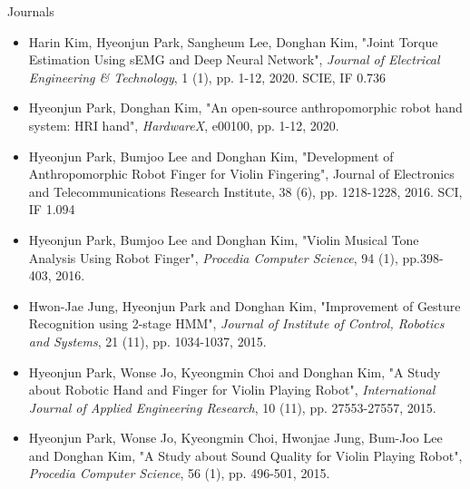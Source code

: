 \documentclass[a4paper,10pt]{article}
\newlength{\cvcolumngapwidth}
\newlength{\cvleftcolumnwidth}
\newlength{\cvrightcolumnwidth}
\newcommand{\cvheadingstyle}[1]{{\normalsize\cvheadingfont\textcolor{cvheadingcolor}{#1}}}
\newlength{\cvafteritemskipamount}
\newlength{\cvparskip}
\newcommand{\cvitem}[2]{
    \begin{minipage}[t]{\cvleftcolumnwidth}
        \raggedleft #1
    \end{minipage}%
    \hspace{\cvcolumngapwidth}%
    \begin{minipage}[t]{\cvrightcolumnwidth}
        \setlength{\parskip}{\cvparskip} #2
    \end{minipage}

    \vspace{\cvafteritemskipamount}
}
\begin{document}
\cvitem{
    \cvheadingstyle{Journals}
}{
    \begin{itemize}
    \item Harin Kim, {\cvimportant Hyeonjun Park}, Sangheum Lee, Donghan Kim, "Joint Torque Estimation Using sEMG and Deep Neural Network", {\em Journal of Electrical Engineering & Technology}, 1 (1), pp. 1-12, 2020.  {\cvimportant SCIE, IF 0.736}
    \item {\cvimportant Hyeonjun Park}, Donghan Kim, "An open-source anthropomorphic robot hand system: HRI hand", {\em HardwareX}, e00100, pp. 1-12, 2020.  
    \item {\cvimportant Hyeonjun Park}, Bumjoo Lee and Donghan Kim, "Development of Anthropomorphic Robot Finger for Violin Fingering", Journal of Electronics and Telecommunications Research Institute, 38 (6), pp. 1218-1228, 2016. {\cvimportant SCI, IF 1.094} 
    \item {\cvimportant Hyeonjun Park}, Bumjoo Lee and Donghan Kim, "Violin Musical Tone Analysis Using Robot Finger", {\em Procedia Computer Science}, 94 (1), pp.398-403, 2016.
    \item Hwon-Jae Jung, {\cvimportant Hyeonjun Park} and Donghan Kim, "Improvement of Gesture Recognition using 2-stage HMM", {\em Journal of Institute of Control, Robotics and Systems}, 21 (11), pp. 1034-1037, 2015.
    \item {\cvimportant Hyeonjun Park}, Wonse Jo, Kyeongmin Choi and Donghan Kim, "A Study about Robotic Hand and Finger for Violin Playing Robot", {\em International Journal of Applied Engineering Research}, 10 (11), pp. 27553-27557, 2015.
    \item {\cvimportant Hyeonjun Park}, Wonse Jo, Kyeongmin Choi, Hwonjae Jung, Bum-Joo Lee and Donghan Kim, "A Study about Sound Quality for Violin Playing Robot", {\em Procedia Computer Science}, 56 (1), pp. 496-501, 2015.        
            
    \end{itemize}
}
\end{document}
